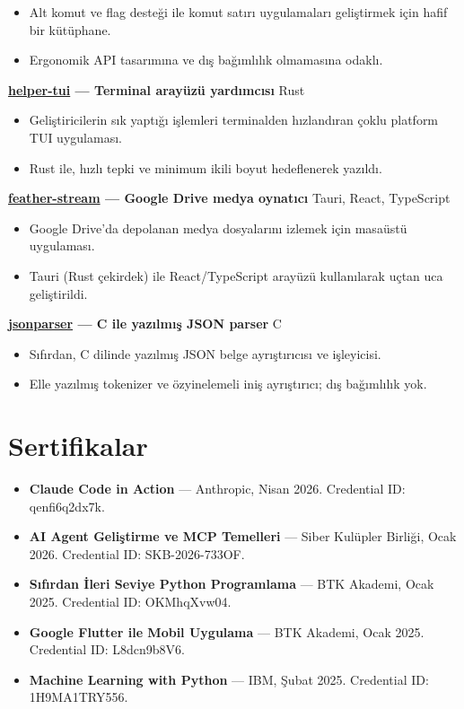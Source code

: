 \documentclass[10pt,a4paper]{extarticle}
\begin{document}
\begin{itemize}[leftmargin=*,noitemsep,topsep=0pt]
    \item Alt komut ve flag desteği ile komut satırı uygulamaları geliştirmek için hafif bir kütüphane.
    \item Ergonomik API tasarımına ve dış bağımlılık olmamasına odaklı.
\end{itemize}
\noindent\textbf{\href{https://github.com/yigit433/helper-tui}{helper-tui} — Terminal arayüzü yardımcısı} \hfill Rust\\
\begin{itemize}[leftmargin=*,noitemsep,topsep=0pt]
    \item Geliştiricilerin sık yaptığı işlemleri terminalden hızlandıran çoklu platform TUI uygulaması.
    \item Rust ile, hızlı tepki ve minimum ikili boyut hedeflenerek yazıldı.
\end{itemize}
\noindent\textbf{\href{https://github.com/yigit433/feather-stream}{feather-stream} — Google Drive medya oynatıcı} \hfill Tauri, React, TypeScript\\
\begin{itemize}[leftmargin=*,noitemsep,topsep=0pt]
    \item Google Drive'da depolanan medya dosyalarını izlemek için masaüstü uygulaması.
    \item Tauri (Rust çekirdek) ile React/TypeScript arayüzü kullanılarak uçtan uca geliştirildi.
\end{itemize}
\noindent\textbf{\href{https://github.com/yigit433/jsonparser}{jsonparser} — C ile yazılmış JSON parser} \hfill C\\
\begin{itemize}[leftmargin=*,noitemsep,topsep=0pt]
    \item Sıfırdan, C dilinde yazılmış JSON belge ayrıştırıcısı ve işleyicisi.
    \item Elle yazılmış tokenizer ve özyinelemeli iniş ayrıştırıcı; dış bağımlılık yok.
\end{itemize}
\section{Sertifikalar}
\begin{itemize}[leftmargin=*,noitemsep,topsep=0pt]
    \item \textbf{Claude Code in Action} --- Anthropic, Nisan 2026. Credential ID: qenfi6q2dx7k.
    \item \textbf{AI Agent Geliştirme ve MCP Temelleri} --- Siber Kulüpler Birliği, Ocak 2026. Credential ID: SKB-2026-733OF.
    \item \textbf{Sıfırdan İleri Seviye Python Programlama} --- BTK Akademi, Ocak 2025. Credential ID: OKMhqXvw04.
    \item \textbf{Google Flutter ile Mobil Uygulama} --- BTK Akademi, Ocak 2025. Credential ID: L8dcn9b8V6.
    \item \textbf{Machine Learning with Python} --- IBM, Şubat 2025. Credential ID: 1H9MA1TRY556.
\end{itemize}
\end{document}
